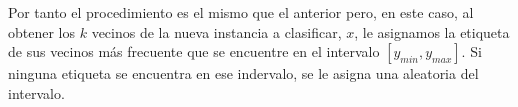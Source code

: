 Por tanto el procedimiento es el mismo que el anterior pero, en este caso, al obtener los $k$ vecinos de la nueva instancia a clasificar, $x$, le asignamos la etiqueta de sus vecinos más frecuente que se encuentre en el intervalo $\left[y_{min},y_{max}\right]$. Si ninguna etiqueta se encuentra en ese indervalo, se le asigna una aleatoria del intervalo.
